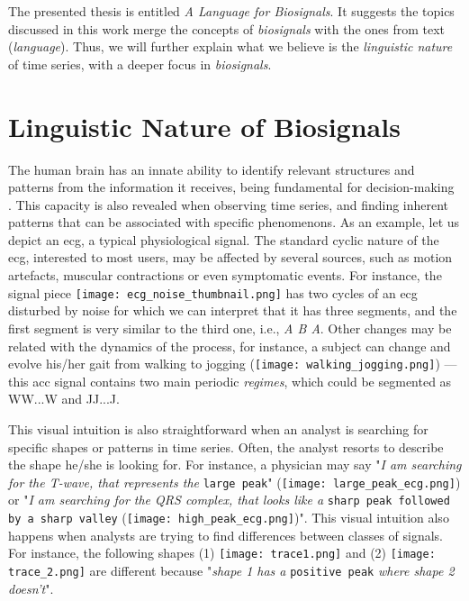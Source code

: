 The presented thesis is entitled \textit{A Language for Biosignals}. It suggests the topics discussed in this work merge the concepts of \textit{biosignals} with the ones from text (\textit{language}). Thus, we will further explain what we believe is the \textit{linguistic nature} of time series, with a deeper focus in \textit{biosignals}.  

\section{Linguistic Nature of Biosignals} 
\label{sub:context1}

The human brain has an innate ability to identify relevant structures and patterns from the information it receives, being fundamental for decision-making \cite{cognition}. This capacity is also revealed when observing time series, and finding inherent patterns that can be associated with specific phenomenons. 
As an example, let us depict an \gls{ecg}, a typical physiological signal. The standard cyclic nature of the \gls{ecg}, interested to most users, may be affected by several sources, such as motion artefacts, muscular contractions or even symptomatic events.
For instance, the signal piece \texttt{[image: ecg\_noise\_thumbnail.png]} has two cycles of an \textcolor{myblue}{\gls{ecg}} disturbed by \textcolor{myred}{noise} for which we can interpret that it has three segments, and the first segment is very similar to the third one, i.e., \textit{\textcolor{myblue}{A} \textcolor{myred}{B} \textcolor{myblue}{A}}. Other changes may be related with the dynamics of the process, for instance, a subject can change and evolve his/her gait from \textcolor{myblue}{walking} to \textcolor{mygreen}{jogging} (\texttt{[image: walking\_jogging.png]}) — this \gls{acc} signal contains two main periodic \textit{regimes}, which could be segmented as \textcolor{myblue}{WW...W} and \textcolor{mygreen}{JJ...J}.

This visual intuition is also straightforward when an analyst is searching for specific shapes or patterns in time series. Often, the analyst resorts to describe the shape he/she is looking for. For instance, a physician may say "\textit{I am searching for the T-wave, that represents the} \texttt{large peak}" (\texttt{[image: large\_peak\_ecg.png]}) or "\textit{I am searching for the QRS complex, that looks like a} \texttt{sharp peak followed by a sharp valley} (\texttt{[image: high\_peak\_ecg.png]})". This visual intuition also happens when analysts are trying to find differences between classes of signals. For instance, the following shapes (1) \texttt{[image: trace1.png]} and (2) \texttt{[image: trace\_2.png]} are different because "\textit{shape 1 has a} \texttt{positive peak} \textit{where shape 2 doesn't}". 

